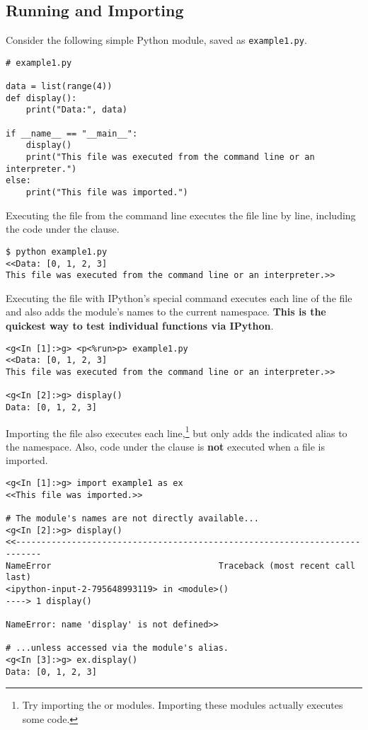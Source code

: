 \subsection*{Running and Importing} %

Consider the following simple Python module, saved as \texttt{example1.py}.

\begin{lstlisting}
# example1.py

data = list(range(4))
def display():
    print("Data:", data)

if __name__ == "__main__":
    display()
    print("This file was executed from the command line or an interpreter.")
else:
    print("This file was imported.")
\end{lstlisting}

Executing the file from the command line executes the file line by line, including the code under the  clause.

\begin{lstlisting}
$ python example1.py
<<Data: [0, 1, 2, 3]
This file was executed from the command line or an interpreter.>>
\end{lstlisting}

Executing the file with IPython's special  command executes each line of the file and also adds the module's names to the current namespace.
\textbf{This is the quickest way to test individual functions via IPython}.

\begin{lstlisting}
<g<In [1]:>g> <p<%run>p> example1.py
<<Data: [0, 1, 2, 3]
This file was executed from the command line or an interpreter.>>

<g<In [2]:>g> display()
Data: [0, 1, 2, 3]
\end{lstlisting}

Importing the file also executes each line,\footnote{Try importing the  or  modules.
Importing these modules actually executes some code.} but only adds the indicated alias to the namespace.
Also, code under the  clause is \textbf{not} executed when a file is imported.

\begin{lstlisting}
<g<In [1]:>g> import example1 as ex
<<This file was imported.>>

# The module's names are not directly available...
<g<In [2]:>g> display()
<<---------------------------------------------------------------------------
NameError                                 Traceback (most recent call last)
<ipython-input-2-795648993119> in <module>()
----> 1 display()

NameError: name 'display' is not defined>>

# ...unless accessed via the module's alias.
<g<In [3]:>g> ex.display()
Data: [0, 1, 2, 3]
\end{lstlisting}

